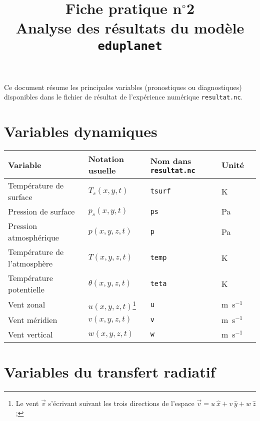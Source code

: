 \documentclass[a4paper,11pt]{article}
\begin{document}

\title{\textbf{Fiche pratique n$^\circ$2}\\
Analyse des résultats du modèle \texttt{eduplanet}}
\date{}

\maketitle

\thispagestyle{empty}

Ce document résume les principales variables (pronostiques ou diagnostiques)
disponibles dans le fichier de résultat de l'expérience numérique \texttt
{resultat.nc}.

\section{Variables dynamiques}

\begin{savenotes}
\begin{table}[h!]
\centering
\begin{tabular}{lllll}
Variable & Notation usuelle & Nom dans \texttt{resultat.nc} & Unité
\\ \hline

Température de surface & $T_s(x,y,t)$ & \texttt{tsurf} & K \\
Pression de surface & $p_s(x,y,t)$ & \texttt{ps} & Pa \\
Pression atmosphérique & $p(x,y,z,t)$ & \texttt{p} & Pa \\
Température de l'atmosphère & $T(x,y,z,t)$ & \texttt{temp} & K \\
Température potentielle & $\theta(x,y,z,t)$ & \texttt{teta} & K \\
Vent zonal & $u(x,y,z,t)$\footnote{Le vent $\vec{v}$ s'écrivant suivant les
trois directions de l'espace $\vec{v}=u\ \hat{x}+v\ \hat{y}+w\ \hat{z}$;} &
\texttt{u} & m~s$^{-1}$ \\
Vent méridien & $v(x,y,z,t)$ & \texttt{v} & m~s$^{-1}$ \\
Vent vertical & $w(x,y,z,t)$ & \texttt{w} & m~s$^{-1}$ \\


\end{tabular}
\end{table}
\end{savenotes}

\section{Variables du transfert radiatif}
\end{document}
